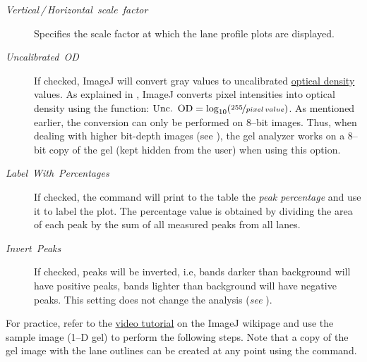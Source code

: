 \begin{description}
\begin{description}
\item [{\emph{Vertical\,/\,Horizontal\ scale\ factor}}] Specifies the
scale factor at which the lane profile plots are displayed. 
\item [{\emph{Uncalibrated\ OD}}] If checked, ImageJ will convert gray
values to uncalibrated \href{http://en.wikipedia.org/wiki/Absorbance}{optical density}
values. As explained in ,
ImageJ converts pixel intensities into optical density using the function:
$\mbox{Unc.\,\ OD}=\log_{10}(\nicefrac{255}{pixel\, value})$. As
mentioned earlier, the conversion can only be performed on 8--bit
images. Thus, when dealing with higher bit-depth images (see ),
the gel analyzer works on a 8--bit copy of the gel (kept hidden from
the user) when using this option. 
\item [{\emph{Label}\ \emph{With}\ \emph{Percentages}}] If checked, the
 command will print to the 
table the \emph{peak percentage} and use it to label the plot. The
percentage value is obtained by dividing the area of each peak by
the sum of all measured peaks from all lanes.
\item [{\emph{Invert}\ \emph{Peaks}}] If checked, peaks will be inverted,
i.e, bands darker than background will have positive peaks, bands
lighter than background will have negative peaks. This setting does
not change the analysis (\emph{see} ).
\end{description}
\end{description}
For practice, refer to the \href{http://imagejdocu.tudor.lu/doku.php?id=video:analysis:gel_quantification_analysis}{video tutorial}
on the ImageJ wikipage and use the {\small {}
}sample image (1--D gel) to perform the following steps. Note that
a copy of the gel image with the lane outlines can be created at any
point using the {\small {}}
command.
